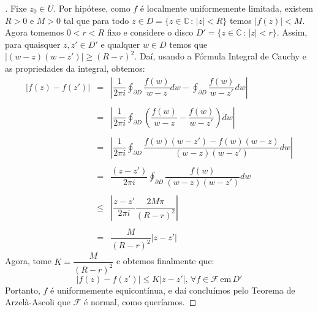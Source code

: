 \begin{proof}[]
Fixe $z_0\in U$. Por hipótese, como $f$ é localmente uniformemente limitada, existem $R>0$ e $M>0$ tal que para todo $z \in D = \{z\in\mathbb{C}\,:\, |z|<R\}$ temos $|f(z)|< M$. Agora tomemos $0<r<R$ fixo e considere o disco $D'=\{z\in\mathbb{C}\,:\, |z|<r\}$. Assim, para quaisquer $z,z'\in D'$ e qualquer $w\in D$ temos que $|(w-z)(w-z')|\geq(R-r)^2$. Daí, usando a Fórmula Integral de Cauchy e as propriedades da integral, obtemos: $$\begin{array}{ccc}|f(z)-f(z')| & = & \left|\dfrac{1}{2\pi i}\displaystyle\oint_{\partial D}\dfrac{f(w)}{w-z}dw - \displaystyle\oint_{\partial D}\dfrac{f(w)}{w-z'}dw\right| \\ \\ & = & \left|\dfrac{1}{2\pi i}\displaystyle\oint_{\partial D}\left(\dfrac{f(w)}{w-z} - \dfrac{f(w)}{w-z'}\right)dw\right| \\ \\ & = &\left|\dfrac{1}{2\pi i}\displaystyle\oint_{\partial D}\dfrac{f(w)(w-z')-f(w)(w-z)}{(w-z)(w-z')}dw\right| \\ \\ & = & \dfrac{(z-z')}{2\pi i}\displaystyle\oint_{\partial D}\dfrac{f(w)}{(w-z)(w-z')}dw \\ \\ & \leq & \left|\dfrac{z-z'}{2\pi i}\dfrac{2M\pi}{(R-r)^2} \right| \\ \\ & = & \dfrac{M}{(R-r)^2}|z-z'| \end{array}$$
Agora, tome $K = \dfrac{M}{(R-r)^2}$ e obtemos finalmente que: $$|f(z)-f(z')|\leq K|z-z'|,\,\forall f\in\mathcal{F}\,\textrm{em}\,D'$$Portanto, $f$ é uniformemente equicontínua, e daí concluímos pelo Teorema de Arzelà-Ascoli que $\mathcal{F}$ é normal, como queríamos.
\end{proof}

